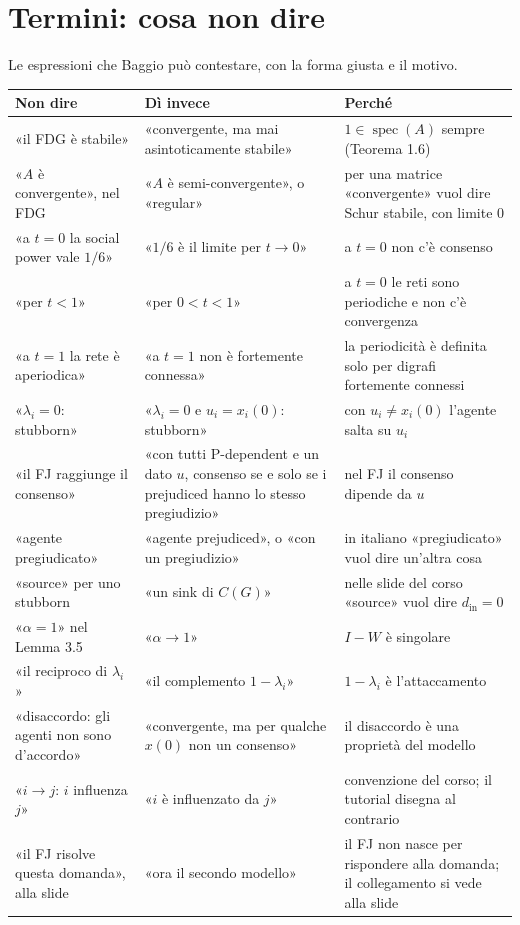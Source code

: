 \documentclass[a4paper,10pt]{article}
\newcommand{\fr}[1]{\getrefnumber{P-#1}}      %
\begin{document}
\clearpage

\section*{Termini: cosa non dire}

Le espressioni che Baggio può contestare, con la forma giusta e il motivo.

\smallskip
{\small
\begin{tabularx}{\textwidth}{>{\raggedright\arraybackslash}p{}>{\raggedright\arraybackslash}p{}>{\raggedright\arraybackslash}X}
  \toprule
  Non dire & Dì invece & Perché \\
  \midrule
  «il FDG è stabile» & «convergente, ma mai asintoticamente stabile» & $1\in\operatorname{spec}(A)$ sempre (Teorema 1.6) \\
  «$A$ è convergente», nel FDG & «$A$ è semi-convergente», o «regular» & per una matrice «convergente» vuol dire Schur stabile, con limite 0 \\
  «a $t=0$ la social power vale $1/6$» & «$1/6$ è il limite per $t\to0$» & a $t=0$ non c'è consenso \\
  «per $t<1$» & «per $0<t<1$» & a $t=0$ le reti sono periodiche e non c'è convergenza \\
  «a $t=1$ la rete è aperiodica» & «a $t=1$ non è fortemente connessa» & la periodicità è definita solo per digrafi fortemente connessi \\
  «$\lambda_i=0$: stubborn» & «$\lambda_i=0$ e $u_i=x_i(0)$: stubborn» & con $u_i\neq x_i(0)$ l'agente salta su $u_i$ \\
  «il FJ raggiunge il consenso» & «con tutti P-dependent e un dato $u$, consenso se e solo se i prejudiced hanno lo stesso pregiudizio» & nel FJ il consenso dipende da $u$ \\
  «agente pregiudicato» & «agente prejudiced», o «con un pregiudizio» & in italiano «pregiudicato» vuol dire un'altra cosa \\
  «source» per uno stubborn & «un sink di $C(G)$» & nelle slide del corso «source» vuol dire $d_{\mathrm{in}}=0$ \\
  «$\alpha=1$» nel Lemma 3.5 & «$\alpha\to1$» & $I-W$ è singolare \\
  «il reciproco di $\lambda_i$» & «il complemento $1-\lambda_i$» & $1-\lambda_i$ è l'attaccamento \\
  «disaccordo: gli agenti non sono d'accordo» & «convergente, ma per qualche $x(0)$ non un consenso» & il disaccordo è una proprietà del modello \\
  «$i\to j$: $i$ influenza $j$» & «$i$ è influenzato da $j$» & convenzione del corso; il tutorial disegna al contrario \\
  «il FJ risolve questa domanda», alla slide \fr{m-bridge} & «ora il secondo modello» & il FJ non nasce per rispondere alla domanda; il collegamento si vede alla slide \fr{m-back-question} \\
  \bottomrule
\end{tabularx}}
\end{document}
